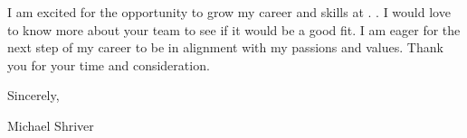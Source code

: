 \documentclass[10pt,oneside]{article}
\begin{document}
\vspace{\baselineskip}

I am excited for the opportunity to grow my career and skills at . . I would love to know more about your team to see if it would be a good fit. I am eager for the next step of my career to be in alignment with my passions and values. Thank you for your time and consideration.

\vspace{\baselineskip}

Sincerely,

\vspace{\baselineskip}

Michael Shriver
\end{document}
